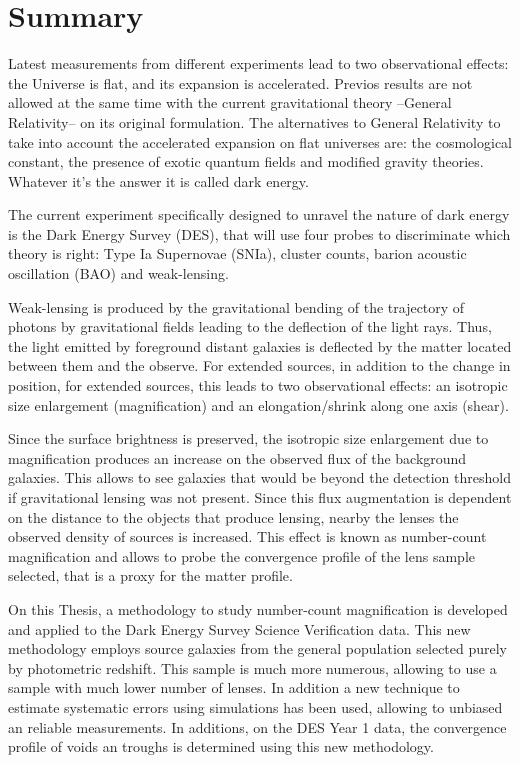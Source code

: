 \chapter*{Summary}
Latest measurements from different experiments lead to two observational effects: the Universe is flat, and its expansion is accelerated. Previos results are not allowed at the same time with the current gravitational theory --General Relativity-- on its original formulation. The alternatives to General Relativity to take into account the accelerated expansion on flat universes are: the cosmological constant, the presence of exotic quantum fields and modified gravity theories. Whatever it's the answer it is called dark energy.
\newline

The current experiment specifically designed to unravel the nature of dark energy is the Dark Energy Survey (DES), that will use four probes to discriminate which theory is right: Type Ia Supernovae (SNIa), cluster counts, barion acoustic oscillation (BAO) and weak-lensing.
\newline

Weak-lensing is produced by the gravitational bending of the trajectory of photons by gravitational fields leading to the deflection of the light rays. Thus, the light emitted by foreground distant galaxies is deflected by the matter located between them and the observe. For extended sources, in addition to the change in position, for extended sources, this leads to two observational effects: an isotropic size enlargement (magnification) and an elongation/shrink along one axis (shear).
\newline

Since the surface brightness is preserved, the isotropic size enlargement due to magnification produces an increase on the observed flux of the background galaxies. This allows to see galaxies that would be beyond the detection threshold if gravitational lensing was not present. Since this flux augmentation is dependent on the distance to the objects that produce lensing, nearby the lenses the observed density of sources is increased. This effect is known as number-count magnification and allows to probe the convergence profile of the lens sample selected, that is a proxy for the matter profile.
\newline

On this Thesis, a methodology to study number-count magnification is developed and applied to the Dark Energy Survey Science Verification data. This new methodology employs source galaxies from the general population selected purely by photometric redshift. This sample is much more numerous, allowing to use a sample with much lower number of lenses. In addition a new technique to estimate systematic errors using simulations has been used, allowing to unbiased an reliable measurements. In additions, on the DES Year 1 data, the convergence profile of voids an troughs is determined using this new methodology.
\newline

